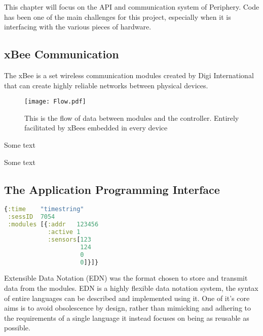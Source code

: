 
This chapter will focus on the API and communication system of Periphery. Code has been one of the main challenges for this project, especially when it is interfacing with the various pieces of hardware.

\subsection{xBee Communication}

The xBee is a set wireless communication modules created by Digi International that can create highly reliable networks between physical devices.

\begin{figure}
  \texttt{[image: Flow.pdf]}
  \caption{This is the flow of data between modules and the controller. Entirely facilitated by xBees embedded in every device}
  \label{fig:xbeecomms}
\end{figure}

Some text



Some text

\FloatBarrier
\subsection{The Application Programming Interface} 


\begin{lstlisting}[language=clojure,frame=single]
{:time    "timestring"
 :sessID  7054
 :modules [{:addr   123456
            :active 1
            :sensors[123 
                     124 
                     0 
                     0]}]}
\end{lstlisting}

Extensible Data Notation (EDN) was the format chosen to store and transmit data from the modules. EDN is a highly flexible data notation system, the syntax of entire languages can be described and implemented using it. One of it's core aims is to avoid obsolescence by design, rather than mimicking and adhering to the requirements of a single language it instead focuses on being as reusable as possible.

